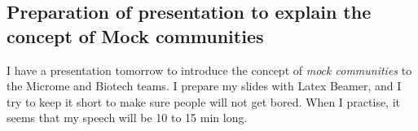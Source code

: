 \subsection{Preparation of presentation to explain the concept of Mock communities}
\label{task:20180111_cj2}

I have a presentation tomorrow to introduce the concept of \textit{mock communities} to the Microme and Biotech teams. I prepare my slides with Latex Beamer, and I try to keep it short to make sure people will not get bored. When I practise, it seems that my speech will be 10 to 15 min long.